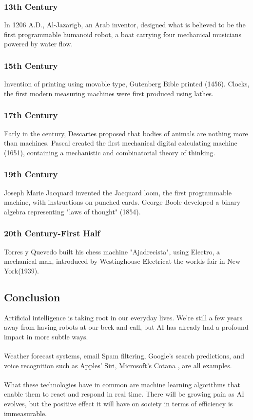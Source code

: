 \documentclass[a4paper,12pt]{report}
\begin{document}
\subsubsection*{13th Century}
In 1206 A.D., Al-Jazarigb, an Arab inventor, designed what is believed to be the first programmable humanoid robot, a boat carrying four mechanical musicians powered by water flow.

\subsubsection*{15th Century}
Invention of printing using movable type, Gutenberg Bible printed (1456). Clocks, the first modern measuring machines were first produced using lathes.

\subsubsection*{17th Century}
Early in the century, Descartes proposed that bodies of animals are nothing more than machines. Pascal created the first mechanical digital calculating machine (1651), containing a mechanistic and combinatorial theory of thinking.

\subsubsection*{19th Century}
Joseph Marie Jacquard invented the Jacquard loom, the first programmable machine, with instructions on punched cards. George Boole developed a binary algebra representing "laws of thought" (1854).

\subsubsection*{20th Century-First Half}
Torres y Quevedo built his chess machine "Ajadrecista", using Electro, a mechanical man, introduced by Westinghouse Electricat the worlds fair in New York(1939). 

\subsection{Conclusion}
Artificial intelligence is taking root in our everyday lives. We're still a few years away from having robots at our beck and call, but AI has already had a profound impact in more subtle ways.\\\\Weather forecast systems, email Spam filtering, Google's search predictions, and voice recognition such as Apples' Siri, Microsoft's Cotana , are all examples.\\\\What these technologies have in common are machine learning algorithms that enable them to react and respond in real time. There will be growing pain as AI evolves, but the positive effect it will have on society in terms of efficiency is immeasurable.
\end{document}
